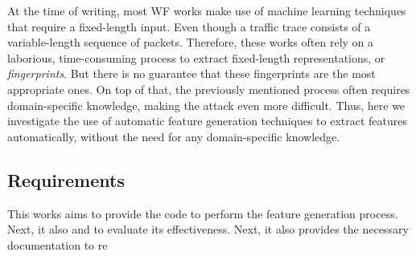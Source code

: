 At the time of writing, most WF works make use of machine learning techniques that require a fixed-length input.
Even though a traffic trace consists of a variable-length sequence of packets.
Therefore, these works often rely on a laborious, time-consuming process to extract fixed-length representations, or \textit{fingerprints}.
But there is no guarantee that these fingerprints are the most appropriate ones.
On top of that, the previously mentioned process often requires domain-specific knowledge, making the attack even more difficult.
Thus, here we investigate the use of automatic feature generation techniques to extract features automatically, without the need for any domain-specific knowledge.


\subsection{Requirements}

This works aims to provide the code to perform the feature generation process.
Next, it also and to evaluate its effectiveness.
Next, it also provides the necessary documentation to re
